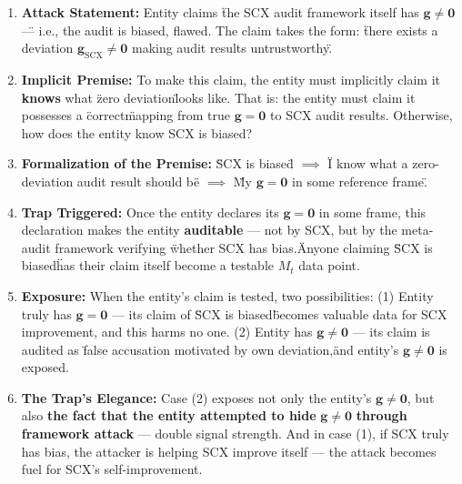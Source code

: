 \documentclass[12pt,a4paper]{article}
\theoremstyle{remark}
\newcommand{\g}{\mathbf{g}}
\begin{document}
\begin{enumerate}[label=\textbf{Step \arabic*:}]
    \item \textbf{Attack Statement:} Entity claims \"the SCX audit framework itself has $ \g \neq \mathbf{0} $\" — i.e., the audit is biased, flawed. The claim takes the form: \"there exists a deviation $ \g_{\text{SCX}} \neq \mathbf{0} $ making audit results untrustworthy.\"
    
    \item \textbf{Implicit Premise:} To make this claim, the entity must implicitly claim it \textbf{knows} what \"zero deviation\" looks like. That is: the entity must claim it possesses a \"correct\" mapping from true $ \g = \mathbf{0} $ to SCX audit results. Otherwise, how does the entity know SCX is biased?
    
    \item \textbf{Formalization of the Premise:} \"SCX is biased\" $ \implies $ \"I know what a zero-deviation audit result should be\" $ \implies $ \"My $ \g = \mathbf{0} $ in some reference frame.\"
    
    \item \textbf{Trap Triggered:} Once the entity declares its $ \g = \mathbf{0} $ in some frame, this declaration makes the entity \textbf{auditable} — not by SCX, but by the meta-audit framework verifying \"whether SCX has bias.\" Anyone claiming \"SCX is biased\" has their claim itself become a testable $ M_t $ data point.
    
    \item \textbf{Exposure:} When the entity's claim is tested, two possibilities: (1) Entity truly has $ \g = \mathbf{0} $ — its claim of \"SCX is biased\" becomes valuable data for SCX improvement, and this harms no one. (2) Entity has $ \g \neq \mathbf{0} $ — its claim is audited as \"false accusation motivated by own deviation,\" and entity's $ \g \neq \mathbf{0} $ is exposed.
    
    \item \textbf{The Trap's Elegance:} Case (2) exposes not only the entity's $ \g \neq \mathbf{0} $, but also \textbf{the fact that the entity attempted to hide} $ \g \neq \mathbf{0} $ \textbf{through framework attack} — double signal strength. And in case (1), if SCX truly has bias, the attacker is helping SCX improve itself — the attack becomes fuel for SCX's self-improvement.
\end{enumerate}
\end{document}
